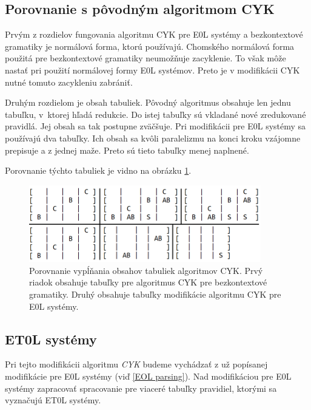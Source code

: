 \subsection*{Porovnanie s pôvodným algoritmom CYK}
Prvým z rozdielov fungovania algoritmu CYK pre E0L systémy a bezkontextové gramatiky je normálová forma, ktorú používajú. Chomského normálová forma použitá pre bezkontextové gramatiky neumožňuje zacyklenie. To však môže nastať pri použití normálovej formy E0L systémov. Preto je v modifikácii CYK nutné tomuto zacykleniu zabrániť.

Druhým rozdielom je obsah tabuliek. Pôvodný algoritmus obsahuje len jednu tabuľku, v~ktorej hľadá redukcie. Do istej tabuľky sú vkladané nové zredukované pravidlá. Jej obsah sa tak postupne zväčšuje. Pri modifikácii pre E0L systémy sa používajú dva tabuľky. Ich obsah sa kvôli paralelizmu na konci kroku vzájomne prepisuje a z jednej maže. Preto sú tieto tabuľky menej naplnené.

Porovnanie týchto tabuliek je vidno na obrázku \ref{compareTables}.



\begin{figure}[hbt]
	\centering
	\includegraphics[width=0.9\textwidth]{obrazky-figures/comparisionOfTables.png}
	\caption{Porovnanie vypĺňania obsahov tabuliek algoritmov CYK. Prvý riadok obsahuje tabuľky pre algoritmus CYK pre bezkontextové gramatiky. Druhý obsahuje tabuľky modifikácie algoritmu CYK pre E0L systémy.}
	\label{compareTables}
\end{figure}

\subsection*{ET0L systémy}
Pri tejto modifikácii algoritmu \textit{CYK} budeme vychádzať z už popísanej modifikácie pre E0L systémy (viď \ref{EOL parsing}). Nad modifikáciou pre E0L systémy zapracovať spracovanie pre viaceré tabuľky pravidiel, ktorými sa vyznačujú ET0L systémy.

